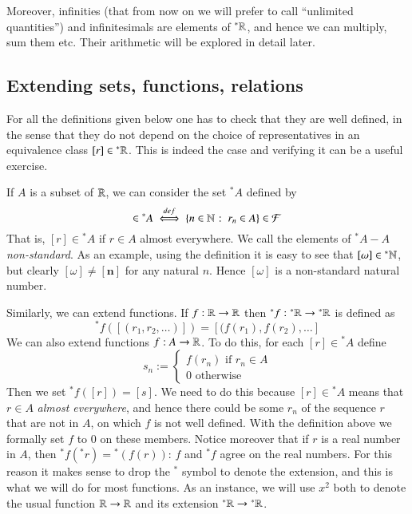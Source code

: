 \documentclass[adraft, copyright,creativecommons,sharealike,noncommercial]{Preambles/eptcs}
\newcommand{\nstar}{{^*}}
\begin{document}
Moreover, infinities (that from now on we will prefer to call ``unlimited quantities'') and infinitesimals are elements of $\nstar \reals$, and hence we can multiply, sum them etc. Their arithmetic will be explored in detail later.

\subsection{Extending sets, functions, relations}\label{sec:extending sets functions relations}
\begin{remark}
	For all the definitions given below one has to check that they are well defined, in the sense that they do not depend on the choice of representatives in an equivalence class $[r] \in \nstar\reals$. This is indeed the case and verifying it can be a useful exercise.
\end{remark}
If $A$ is a subset of $\mathbb{R}$, we can consider the set $\nstar A$ defined by
\begin{equation*}
	[r] \in \nstar A \iffdef \suchthat{n \in \naturals}{r_n \in A} \in \mathcal{F}
\end{equation*}
That is, $[r] \in \nstar A$ if $r \in A$ almost everywhere. We call the elements of $\nstar A - A$ \emph{non-standard}. As an example, using the definition it is easy to see that $[\omega] \in \nstar  \naturals$, but clearly $[\omega] \neq [\mathbf{n}]$ for any natural $n$. Hence $[\omega]$ is a non-standard natural number.

Similarly, we can extend functions. If $f:\mathbb{R} \to \mathbb{R}$ then $\nstar f:\nstar \reals \to \nstar \reals$ is defined as
\begin{equation*}
	\nstar f([(r_1, r_2, \dots)]) = [(f(r_1), f(r_2), \dots]
\end{equation*}
We can also extend functions $f:A \to \mathbb{R}$. To do this, for each $[r] \in \nstar A$ define 
\begin{equation*}
	s_n :=
	\begin{cases}
		f(r_n) \text{ if } r_n \in A\\
		0 \text{ otherwise}
	\end{cases}
\end{equation*}
Then we set $\nstar f([r]) = [s]$. We need to do this because $[r] \in \nstar A$ means that $r \in A$ \emph{almost everywhere}, and hence there could be some $r_n$ of the sequence $r$ that are not in $A$, on which $f$ is not well defined. With the definition above we formally set $f$ to $0$ on these members. Notice moreover that if $r$ is a real number in $A$, then $\nstar f({\nstar r}) = {\nstar (f(r))}$: $f$ and $\nstar f$ agree on the real numbers. For this reason it makes sense to drop the $\nstar $ symbol to denote the extension, and this is what we will do for most functions. As an instance, we will use $x^2$ both to denote the usual function $\mathbb{R} \to \mathbb{R}$ and its extension $\nstar \reals \to {\nstar \reals}$.
\end{document}
